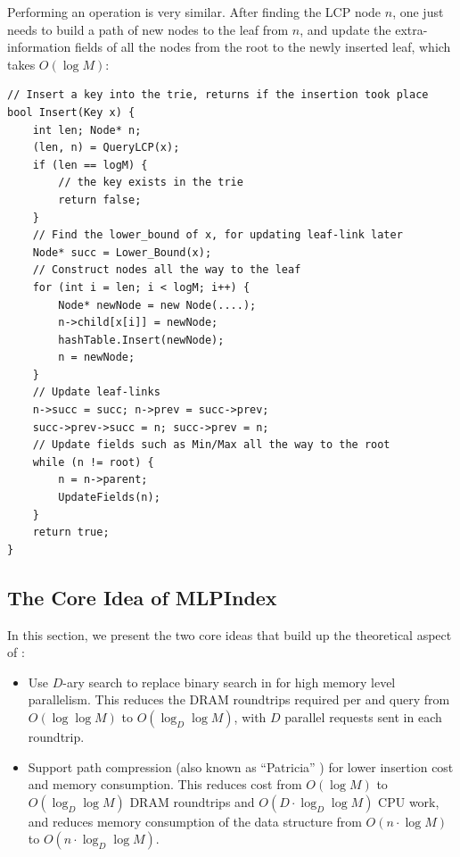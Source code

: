 \documentclass[11pt, usletter]{article}
\begin{document}
Performing an \insertion operation is very similar. 
After finding the LCP node $n$, one just needs to build a path of new nodes to the leaf from $n$, 
and update the extra-information fields of all the nodes from the root to the newly inserted leaf,
which takes $O(\log M)$:

\singlespacing\begin{codebox}
\begin{verbatim}
// Insert a key into the trie, returns if the insertion took place
bool Insert(Key x) {
    int len; Node* n;
    (len, n) = QueryLCP(x);
    if (len == logM) {
        // the key exists in the trie
        return false;
    }
    // Find the lower_bound of x, for updating leaf-link later
    Node* succ = Lower_Bound(x);
    // Construct nodes all the way to the leaf
    for (int i = len; i < logM; i++) {
        Node* newNode = new Node(....);
        n->child[x[i]] = newNode;
        hashTable.Insert(newNode);
        n = newNode;
    }
    // Update leaf-links
    n->succ = succ; n->prev = succ->prev;
    succ->prev->succ = n; succ->prev = n;
    // Update fields such as Min/Max all the way to the root
    while (n != root) {
        n = n->parent;
        UpdateFields(n);
    }
    return true;
}
\end{verbatim}
\end{codebox}\doublespacing

\subsection{The Core Idea of MLPIndex} \label{mlpindex_simple}

In this section, we present the two core ideas that build up the theoretical aspect of \MlpIndex:
\begin{itemize}
[topsep=0pt,partopsep=0pt,itemsep=0pt,parsep=0pt,fullwidth,itemindent=\parindent,listparindent=\parindent]
\item Use $D$-ary search to replace binary search in \QueryLCP for high memory level parallelism.
This reduces the DRAM roundtrips required per \lookup and \lowerbound query from $O(\log\log M)$ to $O(\log_D\log M)$, 
with $D$ parallel requests sent in each roundtrip.
\item Support path compression (also known as ``Patricia'' \cite{patricia}) for lower insertion cost and memory consumption. 
This reduces \insertion cost from $O(\log M)$ to $O(\log_D\log M)$ DRAM roundtrips and $O(D\cdot \log_D\log M)$ CPU work, 
and reduces memory consumption of the data structure from $O(n\cdot\log M)$ to $O(n\cdot\log_D\log M)$.
\end{itemize}
\end{document}
